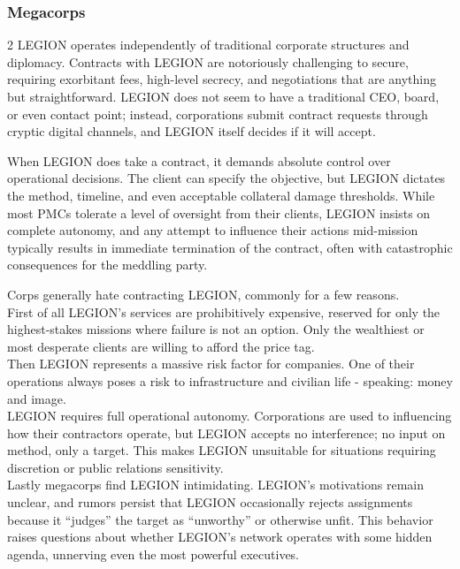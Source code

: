\subsubsection*{Megacorps}
\vspace{5mm}
\begin{multicols}{2}
LEGION operates independently of traditional corporate structures and diplomacy. Contracts with LEGION are notoriously challenging to secure, requiring exorbitant fees, high-level secrecy, and negotiations that are anything but straightforward. LEGION does not seem to have a traditional CEO, board, or even contact point; instead, corporations submit contract requests through cryptic digital channels, and LEGION itself decides if it will accept.
\par
When LEGION does take a contract, it demands absolute control over operational decisions. The client can specify the objective, but LEGION dictates the method, timeline, and even acceptable collateral damage thresholds. While most PMCs tolerate a level of oversight from their clients, LEGION insists on complete autonomy, and any attempt to influence their actions mid-mission typically results in immediate termination of the contract, often with catastrophic consequences for the meddling party.
\par
Corps generally hate contracting LEGION, commonly for a few reasons.
\\%
First of all LEGION's services are prohibitively expensive, reserved for only the highest-stakes missions where failure is not an option.
Only the wealthiest or most desperate clients are willing to afford the price tag.
\\%
Then LEGION represents a massive risk factor for companies.
One of their operations always poses a risk to infrastructure and civilian life - speaking: money and image.
\\%
LEGION requires full operational autonomy.
Corporations are used to influencing how their contractors operate, but LEGION accepts no interference; no input on method, only a target.
This makes LEGION unsuitable for situations requiring discretion or public relations sensitivity.
\\%
Lastly megacorps find LEGION intimidating. LEGION’s motivations remain unclear, and rumors persist that LEGION occasionally rejects assignments because it “judges” the target as “unworthy” or otherwise unfit. This behavior raises questions about whether LEGION’s network operates with some hidden agenda, unnerving even the most powerful executives.
\end{multicols}
